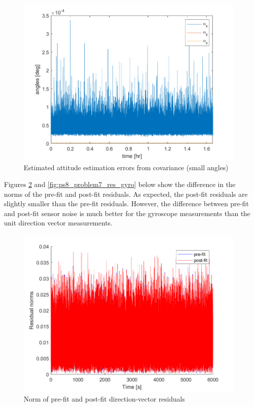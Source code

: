 \begin{figure}[H]
\centering
\includegraphics[scale=0.8]{Images/ps8_problem7_cov.png}
\caption{Estimated attitude estimation errors from covariance (small angles)}
\label{fig:ps8_problem7_cov}
\end{figure}

Figures \ref{fig:ps8_problem7_res_units} and \ref{fig:ps8_problem7_res_gyro} below show the difference in the norms of the pre-fit and post-fit residuals. As expected, the post-fit residuals are slightly smaller than the pre-fit residuals. However, the difference between pre-fit and post-fit sensor noise is much better for the gyroscope measurements than the unit direction vector measurements.

\begin{figure}[H]
\centering
\includegraphics[scale=0.8]{Images/ps8_problem7_res_units.png}
\caption{Norm of pre-fit and post-fit direction-vector residuals}
\label{fig:ps8_problem7_res_units}
\end{figure}

